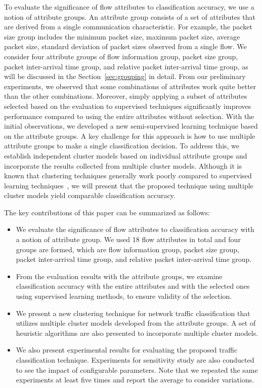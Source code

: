 \documentclass[conference]{IEEEtran}
\begin{document}
To evaluate the significance of flow attributes to classification accuracy, we use a notion of attribute groups.
An attribute group consists of a set of attributes that are derived from a single communication characteristic.
For example, the packet size group includes the minimum packet size, maximum packet size, average packet size, standard deviation of packet sizes observed from a single flow.
We consider four attribute groups of flow information group, packet size group, packet inter-arrival time group, and relative packet inter-arrival time group, as will be discussed in the Section~\ref{sec:grouping} in detail.
From our preliminary experiments, we observed that some combinations of attributes work quite better than the other combinations.
Moreover, simply applying a subset of attributes selected based on the evaluation to supervised techniques significantly improves performance compared to using the entire attributes without selection.
With the initial observations, we developed a new semi-supervised learning technique based on the attribute groups.
A key challenge for this approach is how to use multiple attribute groups to make a single classification decision.
To address this, we establish independent cluster models based on individual attribute groups and incorporate the results collected from multiple cluster models.
Although it is known that clustering techniques generally work poorly compared to supervised learning techniques~\cite{DBLP:conf/infocom/XieIKFN12}, we will present that the proposed technique using multiple cluster models yield comparable classification accuracy.

The key contributions of this paper can be summarized as follows:

\begin{itemize}
	\item We evaluate the significance of flow attributes to classification accuracy with a notion of attribute group.
	We used 18 flow attributes in total and four groups are formed, which are flow information group, packet size group, packet inter-arrival time group, and relative packet inter-arrival time group.
	\item From the evaluation results with the attribute groups, we examine classification accuracy with the entire attributes and with the selected ones using supervised learning methods, to ensure  validity of the selection.
	\item We present a new clustering technique for network traffic classification that utilizes multiple cluster models developed from the attribute groups. A set of heuristic algorithms are also presented to incorporate multiple cluster models.
	\item We also present experimental results for evaluating the proposed traffic classification technique. Experiments for sensitivity study are also conducted to see the impact of configurable parameters. Note that we repeated the same experiments at least five times and report the average to consider variations.
\end{itemize}
\end{document}
